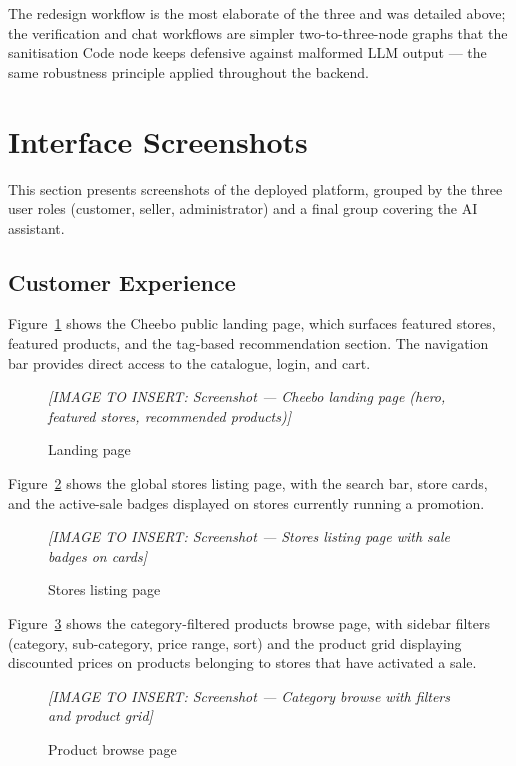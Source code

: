 \documentclass[12pt, a4paper, oneside]{report}
\newcommand{\imagePlaceholder}[2][8cm]{%
  \begin{mdframed}[backgroundcolor=cheebolightgray,linecolor=gray!40]
    \centering
    \vspace{#1}
    \textit{\color{gray}[IMAGE TO INSERT: #2]}
    \vspace{8mm}
  \end{mdframed}
}
\begin{document}
The redesign workflow is the most elaborate of the three and was
detailed above; the verification and chat workflows are simpler
two-to-three-node graphs that the sanitisation Code node keeps
defensive against malformed LLM output --- the same robustness
principle applied throughout the backend.

\section{Interface Screenshots}

This section presents screenshots of the deployed platform, grouped by
the three user roles (customer, seller, administrator) and a final
group covering the AI assistant.

\subsection{Customer Experience}

Figure~\ref{fig:landing} shows the Cheebo public landing page, which
surfaces featured stores, featured products, and the tag-based
recommendation section. The navigation bar provides direct access to
the catalogue, login, and cart.

\begin{figure}[H]
  \centering
  \imagePlaceholder[8cm]{Screenshot — Cheebo landing page (hero, featured stores, recommended products)}
  \caption{Landing page}
  \label{fig:landing}
\end{figure}

Figure~\ref{fig:stores-listing} shows the global stores listing page,
with the search bar, store cards, and the active-sale badges
displayed on stores currently running a promotion.

\begin{figure}[H]
  \centering
  \imagePlaceholder[8cm]{Screenshot — Stores listing page with sale badges on cards}
  \caption{Stores listing page}
  \label{fig:stores-listing}
\end{figure}

Figure~\ref{fig:product-browse} shows the category-filtered products
browse page, with sidebar filters (category, sub-category, price
range, sort) and the product grid displaying discounted prices on
products belonging to stores that have activated a sale.

\begin{figure}[H]
  \centering
  \imagePlaceholder[8cm]{Screenshot — Category browse with filters and product grid}
  \caption{Product browse page}
  \label{fig:product-browse}
\end{figure}
\end{document}
